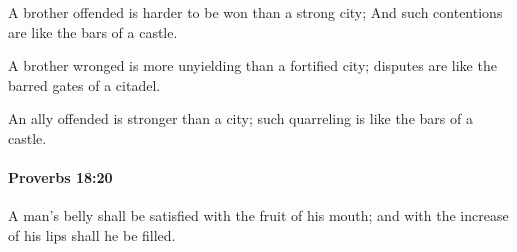 			\begin{versebox}
					\item[BHS] 
					\item[ASV] A brother offended is harder to be won than a strong city; And such contentions are like the bars of a castle.
					\item[NIV] A brother wronged is more unyielding than a fortified city; disputes are like the barred gates of a citadel.
					\item[NRSV] An ally offended is stronger than a city; such quarreling is like the bars of a castle.
			\end{versebox}

		\paragraph{Proverbs 18:20} %
			\label{PROVERBS-18-20}

			A man’s belly shall be satisfied with the fruit of his mouth; and with the increase of his lips shall he be filled.


